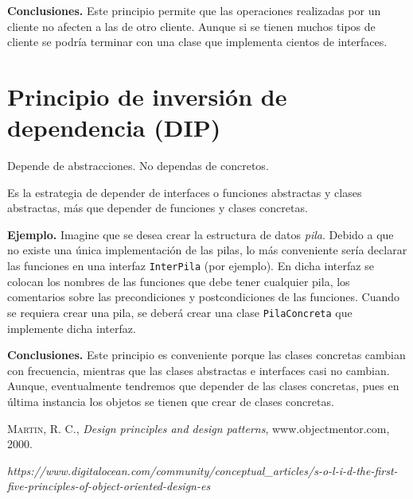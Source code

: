 \documentclass{article}
\begin{document}
\textbf{Conclusiones.} Este principio permite que las operaciones realizadas por un cliente no afecten a las de otro cliente. Aunque si se tienen muchos tipos de cliente se podría terminar con una clase que implementa cientos de interfaces.

\section{Principio de inversión de dependencia (DIP)}

Depende de abstracciones. No dependas de concretos.

Es la estrategia de depender de interfaces o funciones abstractas y clases abstractas, más que depender de funciones y clases concretas.

\textbf{Ejemplo.} Imagine que se desea crear la estructura de datos \textit{pila}. Debido a que no existe una única implementación de las pilas, lo más conveniente sería declarar las funciones en una interfaz \texttt{InterPila} (por ejemplo). En dicha interfaz se colocan los nombres de las funciones que debe tener cualquier pila, los comentarios sobre las precondiciones y postcondiciones de las funciones. Cuando se requiera crear una pila, se deberá crear una clase \texttt{PilaConcreta} que implemente dicha interfaz.

\textbf{Conclusiones.} Este principio es conveniente porque las clases concretas cambian con frecuencia, mientras que las clases abstractas e interfaces casi no cambian. Aunque, eventualmente tendremos que depender de las clases concretas, pues en última instancia los objetos se tienen que crear de clases concretas.

\newpage

\begin{thebibliography}{10}

 \textsc{Martin, R. C.}, \textit{Design principles and design patterns}, www.objectmentor.com, 2000.

 \textit{https://www.digitalocean.com/community/conceptual\_articles/s-o-l-i-d-the-first-five-principles-of-object-oriented-design-es}

\end{thebibliography}
\end{document}
